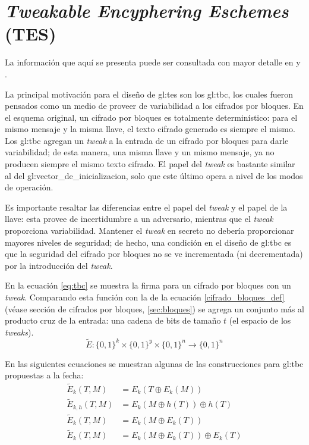 %
%

\section{\textit{Tweakable Encyphering Eschemes} (TES)}
\label{sec:tes}

La información que aquí se presenta puede ser consultada con mayor detalle en
\cite{cifradores_de_disco} y \cite{tweaks}.

La principal motivación para el diseño de \gls{gl:tes} son los \gls{gl:tbc},
los cuales fueron pensados como un medio de proveer de variabilidad a
los cifrados por bloques. En el esquema original, un cifrado por bloques es
totalmente determinístico: para el mismo mensaje y la misma llave, el texto
cifrado generado es siempre el mismo. Los \gls{gl:tbc} agregan un
\textit{tweak} a la entrada de un cifrado por bloques para darle
variabilidad; de esta manera, una misma llave y un mismo mensaje, ya no
producen siempre el mismo texto cifrado. El papel del \textit{tweak} es
bastante similar al del \gls{gl:vector_de_inicializacion}, solo que este
último opera a nivel de los modos de operación.

Es importante resaltar las diferencias entre el papel del \textit{tweak} y el
papel de la llave: esta provee de incertidumbre a un adversario,
mientras que el \textit{tweak} proporciona variabilidad. Mantener el
\textit{tweak} en secreto no debería proporcionar mayores niveles de
seguridad; de hecho, una condición en el diseño de \gls{gl:tbc} es que la
seguridad del cifrado por bloques no se ve incrementada (ni decrementada) por
la introducción del \textit{tweak}.

En la ecuación \ref{eq:tbc} se muestra la firma para un cifrado por bloques
con un \textit{tweak}. Comparando esta función con la de la ecuación
\ref{cifrado_bloques_def} (véase sección de cifrados por bloques,
\ref{sec:bloques}) se agrega un conjunto más al producto cruz de la entrada:
una cadena de bits de tamaño $ t $ (el espacio de los \textit{tweaks}).
\begin{equation}
  \label{eq:tbc}
  \tilde{E}: \{0,1\}^k \times \{0,1\}^y \times \{0,1\}^n
  \longrightarrow \{0,1\}^n
\end{equation}

En las siguientes ecuaciones se muestran algunas de las construcciones para
\gls{gl:tbc} propuestas a la fecha:
\begin{align}
  \label{tbc_trivial}
  \tilde{E}_k(T, M) &= E_k(T \oplus E_k(M)) \\
  \label{tbc_lrw}
  \tilde{E}_{k, h}(T, M) &= E_k(M \oplus h(T)) \oplus h(T) \\
  \label{tbc_we}
  \tilde{E}_{k}(T, M) &= E_k(M \oplus E_k(T)) \\
  \label{tbc_xex}
  \tilde{E}_{k}(T, M) &= E_k(M \oplus E_k(T)) \oplus E_k(T)
\end{align}

